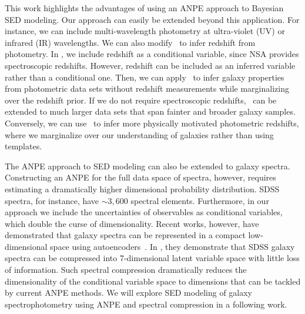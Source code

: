 This work highlights the advantages of using an ANPE approach to Bayesian SED
modeling.  Our approach can easily be extended beyond this application. 
For instance, we can include multi-wavelength photometry at ultra-violet (UV)
or infrared (IR) wavelengths. 
We can also modify \sedflow~to infer redshift from photometry. 
In \sedflow, we include redshift as a conditional variable, since NSA provides
spectroscopic redshifts. 
However, redshift can be included as an inferred variable rather than a
conditional one. 
Then, we can apply \sedflow~to infer galaxy properties from photometric data
sets without redshift measurements while marginalizing over the redshift
prior. 
If we do not require spectroscopic redshifts, \sedflow~can be extended to much
larger data sets that span fainter and broader galaxy samples. 
Conversely, we can use \sedflow~to infer more physically motivated photometric 
redshifts, where we marginalize over our understanding of galaxies rather than
using templates. 

The ANPE approach to SED modeling can also be extended to galaxy spectra. 
Constructing an ANPE for the full data space of spectra, however, requires
estimating a dramatically higher dimensional probability distribution. 
SDSS spectra, for instance, have ${\sim}3,600$ spectral elements.  
Furthermore, in our approach we include the uncertainties of observables as
conditional variables, which double the curse of dimensionality.
Recent works, however, have demonstrated that galaxy spectra can be represented
in a compact low-dimensional space using autoencoders~\citep[][Melchior \&
Hahn, in prep.]{portillo2020}.
In \cite{portillo2020}, they demonstrate that SDSS galaxy spectra can be
compressed into 7-dimensional latent variable space with little loss of
information. 
Such spectral compression dramatically reduces the dimensionality of the
conditional variable space to dimensions that can be tackled by current ANPE
methods. 
We will explore SED modeling of galaxy spectrophotometry using ANPE and
spectral compression in a following work. 




